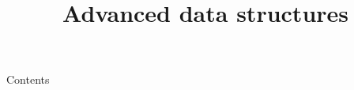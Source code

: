 
\newcommand{\topic}{
	Advanced data structures
}

\usepackage{tikz}

\title{\topic}
\supertitle{\course}
\date{}



\maketitle

\begin{frame}{Contents}
	\tableofcontents
\end{frame}

